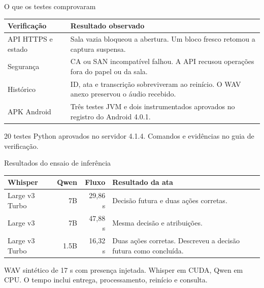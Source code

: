 \documentclass[aspectratio=169,t,xcolor=table]{beamer}
\begin{document}
\begin{frame}{O que os testes comprovaram}
  \vspace{0.4em}
  \small
  \begin{tabularx}{\textwidth}{@{}lY@{}}
    \toprule
    \textbf{Verificação} & \textbf{Resultado observado} \\ \midrule
    API HTTPS e estado & Sala vazia bloqueou a abertura. Um bloco fresco retomou a captura suspensa. \\
    \addlinespace
    Segurança & CA ou SAN incompatível falhou. A API recusou operações fora do papel ou da sala. \\
    \addlinespace
    Histórico & ID, ata e transcrição sobreviveram ao reinício. O WAV anexo preservou o áudio recebido. \\
    \addlinespace
    APK Android & Três testes JVM e dois instrumentados aprovados no registro do Android 4.0.1. \\
    \bottomrule
  \end{tabularx}
  \vspace{0.6em}

  {\small 20 testes Python aprovados no servidor 4.1.4. Comandos e evidências no guia de verificação.}
\end{frame}

\begin{frame}{Resultados do ensaio de inferência}
  \vspace{0.35em}
  \small
  \begin{tabularx}{\textwidth}{@{}lrrY@{}}
    \toprule
    \textbf{Whisper} & \textbf{Qwen} & \textbf{Fluxo} & \textbf{Resultado da ata} \\ \midrule
    Large v3 Turbo & 7B & 29,86 s & Decisão futura e duas ações corretas. \\
    \addlinespace
    Large v3 & 7B & 47,88 s & Mesma decisão e atribuições. \\
    \addlinespace
    Large v3 Turbo & 1.5B & 16,32 s & Duas ações corretas. Descreveu a decisão futura como concluída. \\
    \bottomrule
  \end{tabularx}
  \vspace{0.65em}

  {\small WAV sintético de 17 s com presença injetada. Whisper em CUDA, Qwen em CPU. O tempo inclui entrega, processamento, reinício e consulta.}
\end{frame}
\end{document}
